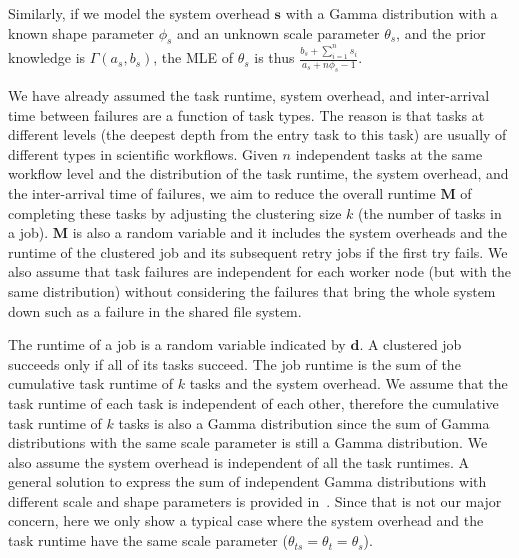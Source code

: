\documentclass{IOS-Book-Article}
\begin{document}
Similarly, if we model the system overhead $\bm s$ with a Gamma distribution with a known shape parameter $\phi_{s}$ and an unknown scale parameter $\theta_s$, and the prior knowledge is $\Gamma(a_s, b_s)$, the MLE of $\theta_s$ is thus $\displaystyle\frac{b_s+\displaystyle\sum_{i=1}^n{s_i}}{a_s+n\phi_s-1}$.

We have already assumed the task runtime, system overhead, and inter-arrival time between failures are a function of task types. The reason is that tasks at different levels (the deepest depth from the entry task to this task) are usually of different types in scientific workflows. Given $n$ independent tasks at the same workflow level and the distribution of the task runtime, the system overhead, and the inter-arrival time of failures, we aim to reduce the overall runtime $\bm M$ of completing these tasks by adjusting the clustering size $k$ (the number of tasks in a job). 
$\bm M$ is also a random variable and it includes the system overheads and the runtime of the clustered job and its subsequent retry jobs if the first try fails. We also assume that task failures are independent for each worker node (but with the same distribution) without considering the failures that bring the whole system down such as a failure in the shared file system. 

The runtime of a job is a random variable indicated by $\bm d$. A clustered job succeeds only if all of its tasks succeed. The job runtime is the sum of the cumulative task runtime of $k$ tasks and the system overhead. We assume that the task runtime of each task is independent of each other, therefore the cumulative task runtime of $k$ tasks is also a Gamma distribution since the sum of Gamma distributions with the same scale parameter is still a Gamma distribution. We also assume the system overhead is independent of all the task runtimes. A general solution to express the sum of independent Gamma distributions with different scale and shape parameters is provided in~\cite{nadarajah2008review}. Since that is not our major concern, here we only show a typical case where the system overhead and the task runtime have the same scale parameter ($\theta_{ts}=\theta_{t}=\theta_{s}$). 
\end{document}
